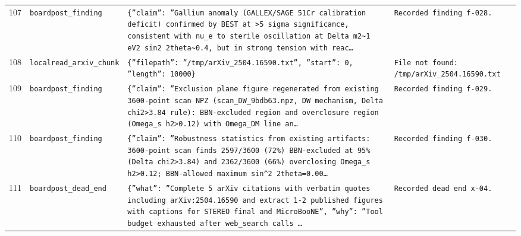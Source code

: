 \documentclass[11pt,a4paper]{article}
\begin{document}
\begin{longtable}{@{}p{}p{}p{}p{}@{}}
107 & \texttt{board}\newline\texttt{post\_\allowbreak{}finding} & \texttt{\{''claim'':\allowbreak{} ''Gallium anomaly (GALLEX/\allowbreak{}SAGE 51Cr calibration deficit)\allowbreak{} confirmed by BEST at \textgreater{}\allowbreak{}5 sigma significance,\allowbreak{} consistent with nu\_\allowbreak{}e to sterile oscillation at Delta m2\textasciitilde{}\allowbreak{}1 eV2 sin2 2theta\textasciitilde{}\allowbreak{}0.4,\allowbreak{} but in strong tension with reac\ldots{}\allowbreak{}} & \texttt{Recorded finding f-028.} \\
108 & \texttt{local}\newline\texttt{read\_\allowbreak{}arxiv\_\allowbreak{}chunk} & \texttt{\{''filepath'':\allowbreak{} ''/\allowbreak{}tmp/\allowbreak{}arXiv\_\allowbreak{}2504.16590.txt'',\allowbreak{} ''start'':\allowbreak{} 0,\allowbreak{} ''length'':\allowbreak{} 10000\}\allowbreak{}} & \texttt{File not found:\allowbreak{} /\allowbreak{}tmp/\allowbreak{}arXiv\_\allowbreak{}2504.16590.txt} \\
109 & \texttt{board}\newline\texttt{post\_\allowbreak{}finding} & \texttt{\{''claim'':\allowbreak{} ''Exclusion plane figure regenerated from existing 3600-point scan NPZ (scan\_\allowbreak{}DW\_\allowbreak{}9bdb63.npz,\allowbreak{} DW mechanism,\allowbreak{} Delta chi2\textgreater{}\allowbreak{}3.84 rule)\allowbreak{}:\allowbreak{} BBN-excluded region and overclosure region (Omega\_\allowbreak{}s h2\textgreater{}\allowbreak{}0.12)\allowbreak{} with Omega\_\allowbreak{}DM line an\ldots{}\allowbreak{}} & \texttt{Recorded finding f-029.} \\
110 & \texttt{board}\newline\texttt{post\_\allowbreak{}finding} & \texttt{\{''claim'':\allowbreak{} ''Robustness statistics from existing artifacts:\allowbreak{} 3600-point scan finds 2597/\allowbreak{}3600 (72\%)\allowbreak{} BBN-excluded at 95\% (Delta chi2\textgreater{}\allowbreak{}3.84)\allowbreak{} and 2362/\allowbreak{}3600 (66\%)\allowbreak{} overclosing Omega\_\allowbreak{}s h2\textgreater{}\allowbreak{}0.12;\allowbreak{} BBN-allowed maximum sin\textasciicircum{}\allowbreak{}2 2theta=\allowbreak{}0.00\ldots{}\allowbreak{}} & \texttt{Recorded finding f-030.} \\
111 & \texttt{board}\newline\texttt{post\_\allowbreak{}dead\_\allowbreak{}end} & \texttt{\{''what'':\allowbreak{} ''Complete 5 arXiv citations with verbatim quotes including arXiv:\allowbreak{}2504.16590 and extract 1-2 published figures with captions for STEREO final and MicroBooNE'',\allowbreak{} ''why'':\allowbreak{} ''Tool budget exhausted after web\_\allowbreak{}search calls \ldots{}\allowbreak{}} & \texttt{Recorded dead end x-04.} \\

\end{longtable}
\end{document}

